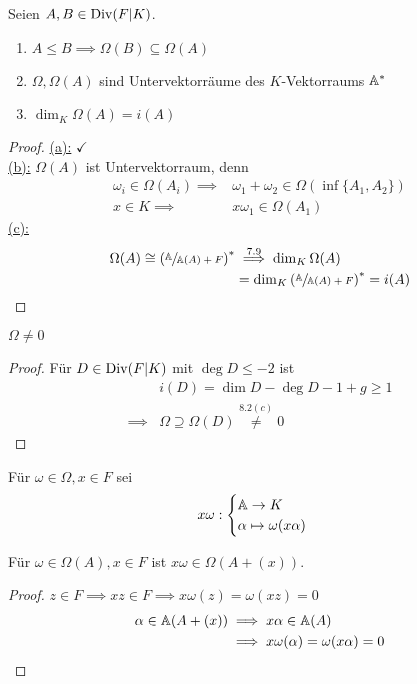 \begin{lemma}
    Seien $A,B \in \operatorname{Div}(F|K)$.
    \begin{enumerate}[label=(\alph*)]
        \item $A \leq B \implies \Omega(B) \subseteq \Omega(A)$
        \item $\Omega,\Omega(A)$ sind Untervektorräume des $K$-Vektorraums $\mathbb{A}^\ast$
        \item $\dim_K\Omega(A) = i(A)$
    \end{enumerate}
\end{lemma}
\begin{proof}
    \underline{(a):} $\checkmark$\\
    \underline{(b):} $\Omega(A)$ ist Untervektorraum, denn
    \begin{align*}
        \omega_i \in \Omega(A_i) \implies & \omega_1 + \omega_2 \in \Omega(\inf\{A_1,A_2\})\\
        x \in K \implies & x\omega_1 \in \Omega(A_1)
    \end{align*}
    \underline{(c):}
    \begin{align*}
        \Omega(A) \cong \left(\sfrac{\mathbb{A}}{\mathbb{A}(A) + F}\right)^\ast &\stackrel{7.9}{\implies} \dim_K \Omega(A)\\
        & = \dim_K\left(\sfrac{\mathbb{A}}{\mathbb{A}(A)+F}\right)^\ast = i(A)
    \end{align*}
\end{proof}

\begin{lemma}
    $\Omega \ne 0$
\end{lemma}
\begin{proof}
    Für $D\in\operatorname{Div}(F|K)$ mit $\deg D \leq - 2$ ist
    \begin{align*}
        &i(D) = \dim D - \deg D - 1 + g \geq 1\\
        \implies & \Omega \supseteq \Omega(D) \stackrel{8.2(c)}{\ne}0
    \end{align*} 
\end{proof}

\begin{definition}
    Für $\omega \in \Omega, x \in F$ sei 
    $$ x\omega: \begin{cases}
        \mathbb{A} \to K\\
        \alpha \mapsto \omega(x\alpha)
    \end{cases}$$
\end{definition}

\begin{lemma}
    Für $\omega\in\Omega(A), x \in F$ ist $x\omega\in \Omega(A+(x))$.
\end{lemma}
\begin{proof}
    $z \in F \implies xz \in F \implies x\omega(z)=\omega(xz)=0$
    \begin{align*}
        \alpha \in \mathbb{A}(A+(x)) &\implies x\alpha \in \mathbb{A}(A)\\
        &\implies x\omega(\alpha) = \omega(x\alpha) = 0
    \end{align*}
\end{proof}

